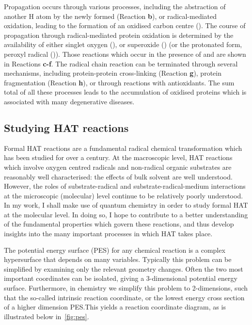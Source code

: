 Propagation occurs through various processes, including the abstraction of another H atom by the newly formed  (Reaction \textbf{b}), or radical-mediated oxidation,\cite{Stadtman2003} leading to the formation of an oxidised carbon centre (). The course of propagation through radical-mediated protein oxidation is determined by the availability of either singlet oxygen (), or superoxide () (or the protonated form, peroxyl radical ()). Those reactions which occur in the presence of  and  are shown in Reactions \textbf{c-f}. The radical chain reaction can be terminated through several mechanisms, including protein-protein cross-linking (Reaction \textbf{g}), protein fragmentation (Reaction \textbf{h}), or through reactions with antioxidants. The sum total of all these processes leads to the accumulation of oxidised proteins which is associated with many degenerative diseases.\cite{Halliwell2006}

\subsection{Studying HAT reactions}

Formal HAT reactions are a fundamental radical chemical transformation which has been studied for over a century.\cite{Kochi1973,Parsons2000} At the macroscopic level, HAT reactions which involve oxygen centred radicals and non-radical organic substrates are reasonably well characterised: the effects of bulk solvent are well understood.\cite{Litwinienko2007} However, the roles of substrate-radical and substrate-radical-medium interactions at the microscopic (molecular) level continue to be relatively poorly understood. In my work, I shall make use of quantum chemistry in order to study formal HAT at the molecular level. In doing so, I hope to contribute to a better understanding of the fundamental properties which govern these reactions, and thus develop insights into the many important processes in which HAT takes place.

The potential energy surface (PES) for any chemical reaction is a complex hypersurface that depends on many variables. Typically this problem can be simplified by examining only the relevant geometry changes. Often the two most important coordinates can be isolated, giving a 3-dimensional potential energy surface. Furthermore, in chemistry we simplify this problem to 2-dimensions, such that the so-called intrinsic reaction coordinate, or the lowest energy cross section of a higher dimension PES.\@ This yields a reaction coordinate diagram, as is illustrated below in~\ref{fig:pes}.

